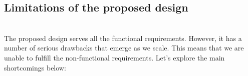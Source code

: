 

\subsection{Limitations of the proposed design}\label{-BoOU68kUn2GwO7n54Bw-}
\\
The proposed design serves all the functional requirements. However, it has a number of serious drawbacks that emerge as we scale. This means that we are unable to fulfill the non-functional requirements. Let's explore the main shortcomings below:

